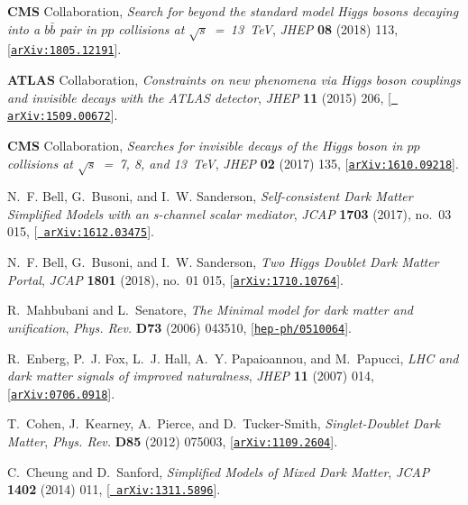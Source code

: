 \documentclass[review]{elsarticle}
\begin{document}
\begin{thebibliography}{100}
{\bf CMS} Collaboration, {\it {Search for beyond the
  standard model Higgs bosons decaying into a $b \bar b$ pair in
  $pp$ collisions at $\sqrt{s}$~=~13~TeV}},  {\em JHEP} {\bf 08} (2018) 113,
  [\href{http://arxiv.org/abs/1805.12191}{{\tt arXiv:1805.12191}}].

{\bf ATLAS} Collaboration, {\it {Constraints on new phenomena
  via Higgs boson couplings and invisible decays with the ATLAS detector}},
  {\em JHEP} {\bf 11} (2015) 206, [\href{http://arxiv.org/abs/1509.00672}{{\tt
  arXiv:1509.00672}}].

{\bf CMS} Collaboration, {\it {Searches for invisible
  decays of the Higgs boson in $pp$ collisions at $\sqrt{s}$~=~7, 8, and 13~TeV}},  
  {\em JHEP} {\bf 02} (2017) 135,
  [\href{http://arxiv.org/abs/1610.09218}{{\tt arXiv:1610.09218}}].

N.~F. Bell, G.~Busoni, and I.~W. Sanderson, {\it {Self-consistent Dark Matter
  Simplified Models with an s-channel scalar mediator}},  {\em JCAP} {\bf 1703}
  (2017), no.~03 015, [\href{http://arxiv.org/abs/1612.03475}{{\tt
  arXiv:1612.03475}}].

N.~F. Bell, G.~Busoni, and I.~W. Sanderson, {\it {Two Higgs Doublet Dark Matter
  Portal}},  {\em JCAP} {\bf 1801} (2018), no.~01 015,
  [\href{http://arxiv.org/abs/1710.10764}{{\tt arXiv:1710.10764}}].

R.~Mahbubani and L.~Senatore, {\it {The Minimal model for dark matter and
  unification}},  {\em Phys. Rev.} {\bf D73} (2006) 043510,
  [\href{http://arxiv.org/abs/hep-ph/0510064}{{\tt hep-ph/0510064}}].

R.~Enberg, P.~J. Fox, L.~J. Hall, A.~Y. Papaioannou, and M.~Papucci, {\it {LHC
  and dark matter signals of improved naturalness}},  {\em JHEP} {\bf 11}
  (2007) 014, [\href{http://arxiv.org/abs/0706.0918}{{\tt arXiv:0706.0918}}].

T.~Cohen, J.~Kearney, A.~Pierce, and D.~Tucker-Smith, {\it {Singlet-Doublet
  Dark Matter}},  {\em Phys. Rev.} {\bf D85} (2012) 075003,
  [\href{http://arxiv.org/abs/1109.2604}{{\tt arXiv:1109.2604}}].

C.~Cheung and D.~Sanford, {\it {Simplified Models of Mixed Dark Matter}},  {\em
  JCAP} {\bf 1402} (2014) 011, [\href{http://arxiv.org/abs/1311.5896}{{\tt
  arXiv:1311.5896}}].


\end{thebibliography}
\end{document}
